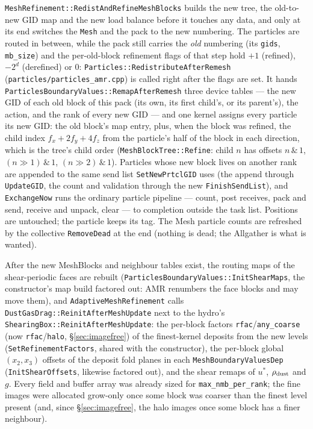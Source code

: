 \documentclass[11pt]{article}
\newcommand{\code}[1]{\texttt{#1}}
\newcommand{\file}[1]{\texttt{\small #1}}
\newcommand{\fn}[1]{\texttt{\small #1}}
\begin{document}
\fn{MeshRefinement::RedistAndRefineMeshBlocks} builds the new tree, the old-to-new GID
map and the new load balance before it touches any data, and only at its end switches
the \code{Mesh} and the pack to the new numbering. The particles are routed in between,
while the pack still carries the \emph{old} numbering (its \code{gids}, \code{mb\_size})
and the per-old-block refinement flags of that step hold $+1$ (refined), $-2^d$
(derefined) or $0$: \fn{Particles::RedistributeAfterRemesh}
(\file{particles/particles\_amr.cpp}) is called right after the flags are set. It hands
\fn{ParticlesBoundaryValues::RemapAfterRemesh} three device tables --- the new GID of
each old block of this pack (its own, its first child's, or its parent's), the action,
and the rank of every new GID --- and one kernel assigns every particle its new GID: the
old block's map entry, plus, when the block was refined, the child index
$f_x + 2 f_y + 4 f_z$ from the particle's half of the block in each direction, which is
the tree's child order (\fn{MeshBlockTree::Refine}: child $n$ has offsets
$n\,\&\,1$, $(n\gg1)\,\&\,1$, $(n\gg2)\,\&\,1$). Particles whose new block lives on
another rank are appended to the same send list \fn{SetNewPrtclGID} uses (the append
through \fn{UpdateGID}, the count and validation through the new \fn{FinishSendList}),
and \fn{ExchangeNow} runs the ordinary particle pipeline --- count, post receives, pack
and send, receive and unpack, clear --- to completion outside the task list. Positions
are untouched; the particle keeps its tag. The Mesh particle counts are refreshed by the
collective \fn{RemoveDead} at the end (nothing is dead; the Allgather is what is wanted).

After the new MeshBlocks and neighbour tables exist, the routing maps of the
shear-periodic faces are rebuilt (\fn{ParticlesBoundaryValues::InitShearMaps}, the
constructor's map build factored out: AMR renumbers the face blocks and may move them),
and \fn{AdaptiveMeshRefinement} calls \fn{DustGasDrag::ReinitAfterMeshUpdate} next to
the hydro's \fn{ShearingBox::ReinitAfterMeshUpdate}: the per-block factors
\code{rfac}/\code{any\_coarse} (now \code{rfac}/\code{halo}, \S\ref{sec:imagefree}) of the
finest-kernel deposits from the new levels
(\fn{SetRefinementFactors}, shared with the constructor), the per-block global
$(x_2,x_3)$ offsets of the deposit fold planes in each \code{MeshBoundaryValuesDep}
(\fn{InitShearOffsets}, likewise factored out), and the shear remaps of $u^*$,
$\rho_{\rm dust}$ and $g$. Every field and buffer array was already sized for
\code{max\_nmb\_per\_rank}; the fine images were allocated grow-only once some block was
coarser than the finest level present (and, since \S\ref{sec:imagefree}, the halo images
once some block has a finer neighbour).
\end{document}
